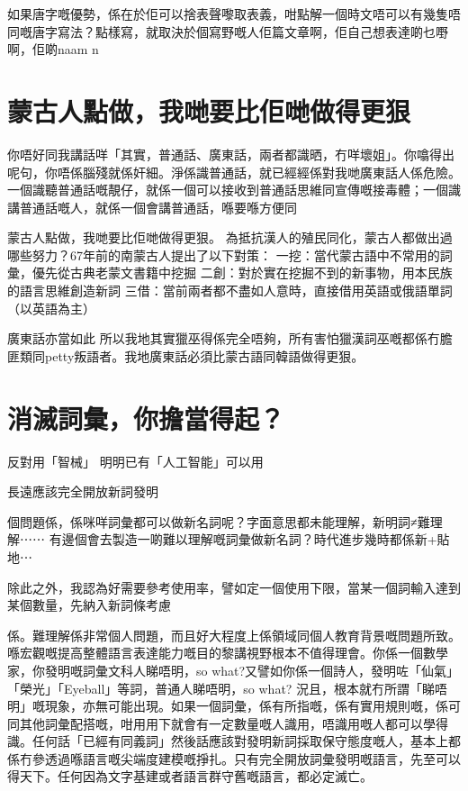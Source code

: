 如果唐字嘅優勢，係在於佢可以捨表聲嚟取表義，咁點解一個時文唔可以有幾隻唔同嘅唐字寫法？點樣寫，就取決於個寫野嘅人佢篇文章啊，佢自己想表達啲乜嘢啊，佢啲naam n


\section{蒙古人點做，我哋要比佢哋做得更狠}
你唔好同我講話咩「其實，普通話、廣東話，兩者都識晒，冇咩壞姐」。你噏得出呢句，你唔係腦殘就係奸細。淨係識普通話，就已經經係對我哋廣東話人係危險。一個識聽普通話嘅靚仔，就係一個可以接收到普通話思維同宣傳嘅接毒體；一個識講普通話嘅人，就係一個會講普通話，喺要喺方便同


蒙古人點做，我哋要比佢哋做得更狠。
為抵抗漢人的殖民同化，蒙古人都做出過哪些努力？67年前的南蒙古人提出了以下對策：
一挖：當代蒙古語中不常用的詞彙，優先從古典老蒙文書籍中挖掘
二創：對於實在挖掘不到的新事物，用本民族的語言思維創造新詞
三借：當前兩者都不盡如人意時，直接借用英語或俄語單詞（以英語為主）

廣東話亦當如此
所以我地其實獵巫得係完全唔夠，所有害怕獵漢詞巫嘅都係冇膽匪類同petty叛語者。我地廣東話必須比蒙古語同韓語做得更狠。



\section{消滅詞彙，你擔當得起？}
反對用「智械」
明明已有「人工智能」可以用

長遠應該完全開放新詞發明

個問題係，係咪咩詞彙都可以做新名詞呢？字面意思都未能理解，新明詞≠難理解⋯⋯ 有邊個會去製造一啲難以理解嘅詞彙做新名詞？時代進步幾時都係新+貼地⋯

除此之外，我認為好需要參考使用率，譬如定一個使用下限，當某一個詞輸入達到某個數量，先納入新詞條考慮


係。難理解係非常個人問題，而且好大程度上係領域同個人教育背景嘅問題所致。喺宏觀嘅提高整體語言表達能力嘅目的黎講視野根本不值得理會。你係一個數學家，你發明嘅詞彙文科人睇唔明，so what?又譬如你係一個詩人，發明咗「仙氣」「榮光」「Eyeball」等詞，普通人睇唔明，so what? 況且，根本就冇所謂「睇唔明」嘅現象，亦無可能出現。如果一個詞彙，係有所指嘅，係有實用規則嘅，係可同其他詞彙配搭嘅，咁用用下就會有一定數量嘅人識用，唔識用嘅人都可以學得識。任何話「已經有同義詞」然後話應該對發明新詞採取保守態度嘅人，基本上都係冇參透過喺語言嘅尖端度建模嘅掙扎。只有完全開放詞彙發明嘅語言，先至可以得天下。任何因為文字基建或者語言群守舊嘅語言，都必定滅亡。

